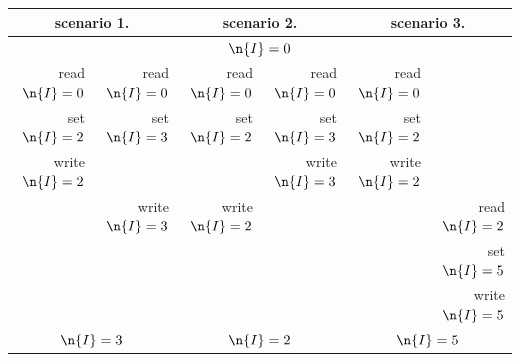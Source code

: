 
\begin{tabular}{rrrrrr}
  \toprule
  \multicolumn{2}{c}{scenario 1.}& \multicolumn{2}{c}{scenario 2.}&
  \multicolumn{2}{c}{scenario 3.}\\ \midrule
  \multicolumn{6}{c}{$\n{I}=0$}\\ \midrule
  read $\n{I}=0$&read $\n{I}=0$&
  read $\n{I}=0$&read $\n{I}=0$&
  read $\n{I}=0$& \\
  set $\n{I}=2$&set $\n{I}=3$& 
  set $\n{I}=2$&set $\n{I}=3$&
  set $\n{I}=2$& \\
  write $\n{I}=2$& & &write $\n{I}=3$&write $\n{I}=2$& \\
  &write $\n{I}=3$&write $\n{I}=2$& & &read $\n{I}=2$\\
  &&&&&set $\n{I}=5$\\
  &&&&&write $\n{I}=5$\\
  \midrule
  \multicolumn{2}{c}{$\n{I}=3$}& \multicolumn{2}{c}{$\n{I}=2$}&
  \multicolumn{2}{c}{$\n{I}=5$}
  \\ \bottomrule
\end{tabular}
